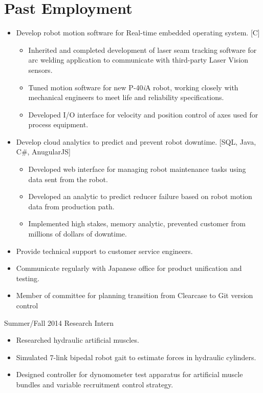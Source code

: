 \documentclass{BradyResume}
\begin{document}
\section*{Past Employment}
\begin{itemize}
  \item Develop robot motion software for Real-time embedded operating system. [C]
  \begin{itemize}
  	  \item Inherited and completed development of  laser seam tracking software for arc welding application to communicate with third-party Laser Vision sensors.
	  \item Tuned motion software for new P-40{\it{i}}A robot, working closely with mechanical engineers to meet life and reliability specifications.
	  \item Developed I/O interface for velocity and position control of axes used for process equipment.
  \end{itemize}
  \item Develop cloud analytics to predict and prevent robot downtime. [SQL, Java, C\#, AnugularJS]
  \begin{itemize}
    \item Developed web interface for managing robot maintenance tasks using data sent from the robot.
    \item Developed an analytic to predict reducer failure based on  robot motion data from production path.
    \item Implemented high stakes, memory analytic, prevented customer from millions of dollars of downtime.
  \end{itemize}
  \item Provide technical support to customer service engineers.
  
  \item Communicate regularly with Japanese office for product unification and testing.
  \item Member of committee for planning transition from Clearcase to Git version control

\end{itemize}
%
           {Summer/Fall 2014}%
           {Research Intern}
\begin{itemize}
  \item Researched hydraulic artificial muscles.
  \item Simulated 7-link bipedal robot gait to estimate forces in hydraulic cylinders.
  \item Designed controller for dynomometer test apparatus for artificial muscle bundles and variable recruitment control strategy.
\end{itemize}
\end{document}
